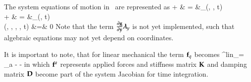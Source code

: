 \begin{center}
\begin{longtable}{| p{5cm} | p{5cm} | p{6cm} |}
	  \end{longtable}
	\end{center}

The system equations of motion in \codeName\ are represented as 
\bea \label{eq_system_EOM}
  \Mm \ddot \qv +  \tlambda & = &\fv_\SO(\qv, \dot \qv, t) \\
  \dot \yv +  \tlambda & = &\fv_\FO(\yv, t) \\
	\gv(\qv, \dot \qv, \yv, \tlambda, t) &=& 0
\eea
Note that the term $\frac{\partial \mathbf{g}}{\partial \mathbf{y}} \mbox{\boldmath $\lambda$ \unboldmath}\!\!_y$ is not yet implemented, such that algebraic equations may not yet depend on \FON coordinates.

It is important to note, that for linear mechanical the term $\mathbf{f}_q$ becomes
\be
  \fv^{lin}_\SO = \fv_a - \Km \qv - \Dm \dot \qv
\ee
in which $\mathbf{f}^a$ represents applied forces and stiffness matrix $\mathbf{K}$ and damping matrix $\mathbf{D}$ become part of the system Jacobian for time integration.





